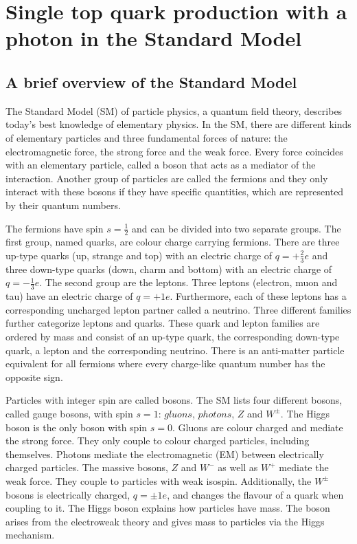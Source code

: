 
\chapter{Single top quark production with a photon in the Standard Model}
\label{chap:tqgamma_production}
\section{A brief overview of the Standard Model}

The Standard Model (SM) of particle physics, a quantum field theory,  describes today's best knowledge of elementary physics. 
In the SM, there are different kinds of elementary particles and three fundamental forces of nature: the electromagnetic force, the strong force and the weak force. 
Every force coincides with an elementary particle, called a boson that acts as a mediator of the interaction. Another group of particles are called the fermions and they only interact with these bosons if they have specific quantities, which are represented by their quantum numbers.

The fermions have spin $s = \frac{1}{2}$ and can be divided into two separate groups. The first group, named quarks, are colour charge carrying fermions. 
There are three up-type quarks (up, strange and top) with an electric charge of $q = +\frac{2}{3}e$ and three down-type quarks (down, charm and bottom) with an electric charge of $q = -\frac{1}{3}e$. 
The second group are the leptons. Three leptons (electron, muon and tau) have an electric charge of $q = +1e$. Furthermore, each of these leptons has a corresponding uncharged lepton partner called a neutrino.
Three different families further categorize leptons and quarks. These quark and lepton families are ordered by mass and consist of an up-type quark, the corresponding down-type quark, a lepton and the corresponding neutrino. 
There is an anti-matter particle equivalent for all fermions where every charge-like quantum number has the opposite sign. 

Particles with integer spin are called bosons. The SM lists four different bosons, called gauge bosons, with spin $s = 1$: $gluons$, $photons$, $Z$ and $W^{\pm}$. The Higgs boson is the only boson with spin $s=0$.
Gluons are colour charged and mediate the strong force. They only couple to colour charged particles, including themselves. Photons mediate the electromagnetic (EM) between electrically charged particles. The massive bosons, $Z$ and $W^{-}$ as well as $W^{+}$ mediate the weak force. They couple to particles with weak isospin. Additionally, the $W^{\pm}$ bosons is electrically charged, $q = \pm 1e$, and changes the flavour of a quark when coupling to it.
The Higgs boson explains how particles have mass. The boson arises from the electroweak theory and gives mass to particles via the Higgs mechanism. 

